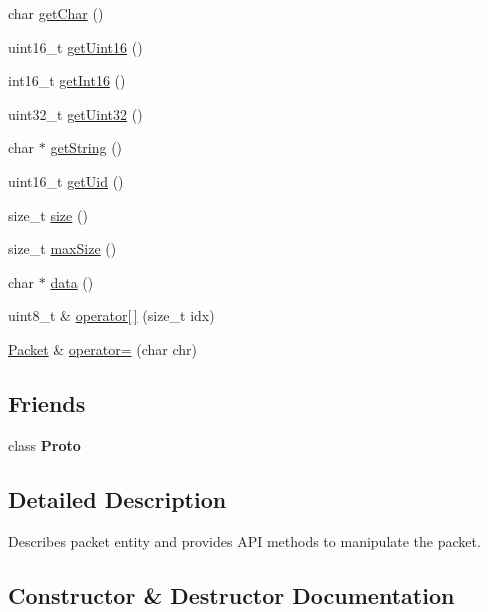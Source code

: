\begin{DoxyCompactItemize}
char \hyperlink{classTiny_1_1Packet_a260645f9d055da878f149a13ecd58844}{get\+Char} ()
\item 
uint16\+\_\+t \hyperlink{classTiny_1_1Packet_a71765e73adfbc67138f75c2b8ea7d74c}{get\+Uint16} ()
\item 
int16\+\_\+t \hyperlink{classTiny_1_1Packet_a7dfed04418564f93dd4d2b4e9144a861}{get\+Int16} ()
\item 
uint32\+\_\+t \hyperlink{classTiny_1_1Packet_a5dd4b89cb7224b62d4f0328c8e40f38f}{get\+Uint32} ()
\item 
char $\ast$ \hyperlink{classTiny_1_1Packet_a8bc9a3b3f41be292f9c5ac566afeb04b}{get\+String} ()
\item 
uint16\+\_\+t \hyperlink{classTiny_1_1Packet_a5333df49a8becff438d3e36b0ca8d3f0}{get\+Uid} ()
\item 
size\+\_\+t \hyperlink{classTiny_1_1Packet_a872f81d4ad35e49b232101c7c12e34f2}{size} ()
\item 
size\+\_\+t \hyperlink{classTiny_1_1Packet_ac6545b3b5df97d5f1ea1a15abc0570ed}{max\+Size} ()
\item 
char $\ast$ \hyperlink{classTiny_1_1Packet_a3307ba504caba9c5eee8f1f32cf1a749}{data} ()
\item 
uint8\+\_\+t \& \hyperlink{classTiny_1_1Packet_abfaef504eb88a4db88bca3b907770fa2}{operator\mbox{[}$\,$\mbox{]}} (size\+\_\+t idx)
\item 
\hyperlink{classTiny_1_1Packet}{Packet} \& \hyperlink{classTiny_1_1Packet_a2de2c7f2c3ea6baaab462dd7e4469ecb}{operator=} (char chr)
\end{DoxyCompactItemize}
\subsection*{Friends}
\begin{DoxyCompactItemize}
\item 
\hypertarget{classTiny_1_1Packet_a45bd055fddab40aaf0c60bfb9e21aa6f}{}class {\bfseries Proto}\label{classTiny_1_1Packet_a45bd055fddab40aaf0c60bfb9e21aa6f}

\end{DoxyCompactItemize}


\subsection{Detailed Description}
Describes packet entity and provides A\+P\+I methods to manipulate the packet. 

\subsection{Constructor \& Destructor Documentation}
\hypertarget{classTiny_1_1Packet_aad47b3053945b29b1b46d76b31b72960}{}

